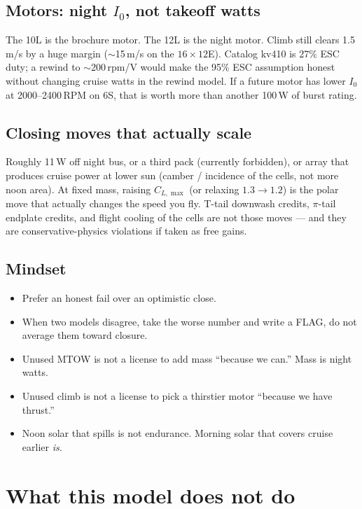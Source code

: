\documentclass[11pt,letterpaper]{article}
\begin{document}
\subsection{Motors: night $I_0$, not takeoff watts}

The 10L is the brochure motor. The 12L is the night motor. Climb still clears 1.5\,m/s by a huge margin ($\sim$15\,m/s on the $16\times12$E). Catalog kv410 is 27\% ESC duty; a rewind to $\sim$200\,rpm/V would make the 95\% ESC assumption honest without changing cruise watts in the rewind model. If a future motor has lower $I_0$ at 2000--2400\,RPM on 6S, that is worth more than another 100\,W of burst rating.

\subsection{Closing moves that actually scale}

Roughly 11\,W off night bus, or a third pack (currently forbidden), or array that produces cruise power at lower sun (camber / incidence of the cells, not more noon area). At fixed mass, raising $C_{L,\max}$ (or relaxing $1.3\to 1.2$) is the polar move that actually changes the speed you fly. T-tail downwash credits, $\pi$-tail endplate credits, and flight cooling of the cells are not those moves --- and they are conservative-physics violations if taken as free gains.

\subsection{Mindset}

\begin{itemize}
  \item Prefer an honest fail over an optimistic close.
  \item When two models disagree, take the worse number and write a FLAG, do not average them toward closure.
  \item Unused MTOW is not a license to add mass ``because we can.'' Mass is night watts.
  \item Unused climb is not a license to pick a thirstier motor ``because we have thrust.''
  \item Noon solar that spills is not endurance. Morning solar that covers cruise earlier \emph{is}.
\end{itemize}

\section{What this model does not do}
\end{document}
